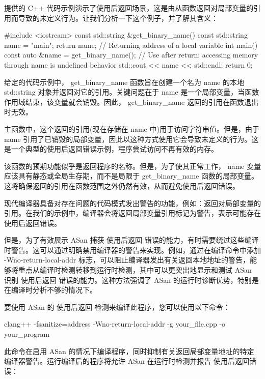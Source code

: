
提供的 C++ 代码示例演示了使用后返回场景，这是由从函数返回对局部变量的引用而导致的未定义行为。让我们分析一下这个例子，并了解其含义：

\begin{cpp}
#include <iostream>
const std::string &get_binary_name() {
    const std::string name = "main";
    return name; // Returning address of a local variable
}
int main() {
    const auto &name = get_binary_name();
    // Use after return: accessing memory through name is undefined behavior
    std::cout << name << std::endl;
    return 0;
}
\end{cpp}

给定的代码示例中， get\_binary\_name 函数旨在创建一个名为 name 的本地 std::string 对象并返回对它的引用。关键问题在于 name 是一个局部变量，当函数作用域结束，该变量就会销毁。因此， get\_binary\_name 返回的引用在函数退出时无效。

主函数中，这个返回的引用(现在存储在 name 中)用于访问字符串值。但是，由于 name 引用了已销毁的局部变量，因此以这种方式使用它会导致未定义的行为。这是一个典型的使用后返回错误示例，程序尝试访问不再有效的内存。

该函数的预期功能似乎是返回程序的名称。但是，为了使其正常工作， name 变量应该具有静态或全局生存期，而不是局限于 get\_binary\_name 函数的局部变量。这将确保返回的引用在函数范围之外仍然有效，从而避免使用后返回错误。

现代编译器具备对存在问题的代码模式发出警告的功能，例如：返回对局部变量的引用。在我们的示例中，编译器会将返回局部变量引用标记为警告，表示可能存在使用后返回错误。

但是，为了有效展示 ASan 捕获 使用后返回 错误的能力，有时需要绕过这些编译时警告。这可以通过明确禁用编译器的警告来实现。例如，通过在编译命令中添加 -Wno-return-local-addr 标志，可以阻止编译器发出有关返回本地地址的警告，能够将重点从编译时检测转移到运行时检测，其中可以更突出地显示和测试 ASan 识别 使用后返回 错误的能力。这种方法强调了 ASan 的运行时诊断优势，特别是在编译时分析不够的情况下。


要使用 ASan 的 使用后返回 检测来编译此程序，您可以使用以下命令：

\begin{shell}
clang++ -fsanitize=address -Wno-return-local-addr -g your_file.cpp -o your_program
\end{shell}

此命令在启用 ASan 的情况下编译程序，同时抑制有关返回局部变量地址的特定编译器警告。运行编译后的程序将允许 ASan 在运行时检测并报告 使用后返回错误：

